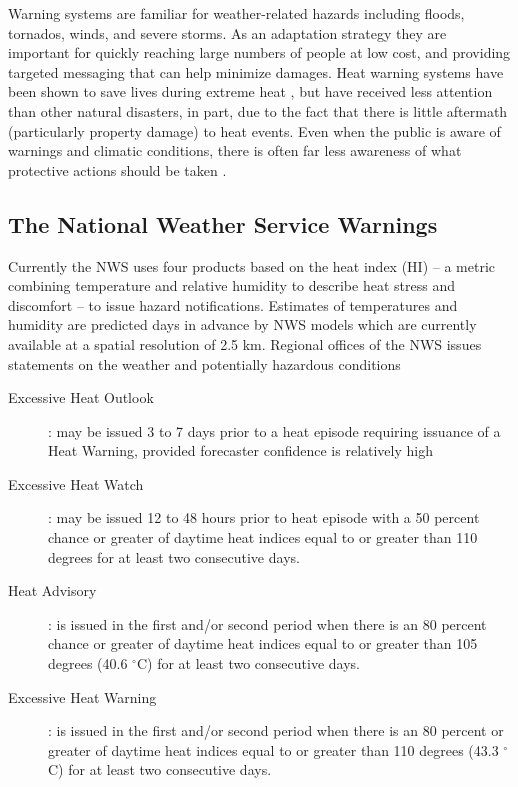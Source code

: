 \documentclass{ametsoc}
\begin{document}
Warning systems are familiar for weather-related hazards including floods, tornados, winds, and severe storms. As an adaptation strategy they are important for quickly reaching large numbers of people at low cost, and providing targeted messaging that can help minimize damages. Heat warning systems have been shown to save lives during extreme heat \citep{Ebi2004}, but have received less attention than other natural disasters, in part, due to the fact that there is little aftermath (particularly property damage) to heat events. Even when the public is aware of warnings and climatic conditions, there is often far less awareness of what protective actions should be taken \citep{Sheridan2007}.  

\subsection{The National Weather Service Warnings}\label{subsec:NWSWarnings}
Currently the NWS uses four products based on the heat index (HI) -- a metric combining temperature and relative humidity to describe heat stress and discomfort -- to issue hazard notifications. Estimates of temperatures and humidity are predicted days in advance by NWS models which are currently available at a spatial resolution of 2.5 km. Regional offices of the NWS issues statements on the weather and potentially hazardous conditions 

\begin{description} 
\item[Excessive Heat Outlook]: may be issued 3 to 7 days prior to a heat episode requiring issuance of a Heat Warning, provided forecaster confidence is relatively high 
\item[Excessive Heat Watch]: may be issued 12 to 48 hours prior to heat episode with a 50 percent chance or greater of daytime heat indices equal to or greater than 110 degrees for at least two consecutive days. 
\item[Heat Advisory]: is issued in the first and/or second period when there is an 80 percent chance or greater of daytime heat indices equal to or greater than 105 degrees (40.6 $^{\circ}$C) for at least two consecutive days. 
\item[Excessive Heat Warning]: is issued in the first and/or second period when there is an 80 percent or greater of daytime heat indices equal to or greater than 110 degrees (43.3 $^{\circ}$C) for at least two consecutive days. 
\end{description}
\end{document}
